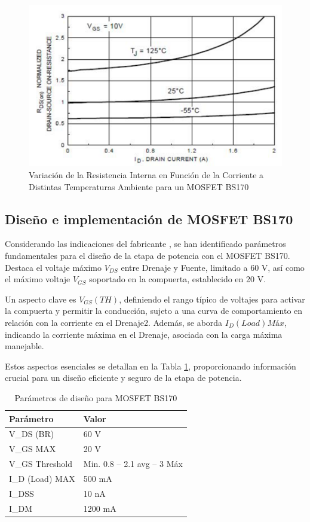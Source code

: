\begin{figure}[h]
  \centering
  \includegraphics[width=0.9\linewidth]{Pictures/resvscorriente.png} 
  \caption{Variación de la Resistencia Interna en Función de la Corriente a Distintas Temperaturas Ambiente para un MOSFET BS170 \cite{BS170Datasheet}}
  \label{fig:resinternavscorriente}
\end{figure}

\newpage

\subsection{Diseño e implementación de MOSFET BS170}
    

Considerando las indicaciones del fabricante \cite{BS170Datasheet}, se han identificado parámetros fundamentales para el diseño de la etapa de potencia con el MOSFET BS170. Destaca el voltaje máximo $V_{DS}$ entre Drenaje y Fuente, limitado a 60 V, así como el máximo voltaje $V_{GS}$ soportado en la compuerta, establecido en 20 V.

Un aspecto clave es $V_{GS}(TH)$, definiendo el rango típico de voltajes para activar la compuerta y permitir la conducción, sujeto a una curva de comportamiento en relación con la corriente en el Drenaje2. Además, se aborda $I_{D}(Load) Máx$, indicando la corriente máxima en el Drenaje, asociada con la carga máxima manejable.

Estos aspectos esenciales se detallan en la Tabla \ref{tab:Designbs170}, proporcionando información crucial para un diseño eficiente y seguro de la etapa de potencia.

\begin{table}[!ht]
    \centering
    \begin{tabular}{l l}
    \hline
        \textbf{Parámetro} & \textbf{Valor} \\ \hline
        V\_DS (BR) & 60 V \\ 
        V\_GS  MAX & 20 V \\ 
        V\_GS Threshold & Min. 0.8 – 2.1 avg – 3 Máx \\ 
        I\_D (Load) MAX & 500 mA \\ 

        I\_DSS & 10 nA \\ 
        I\_DM & 1200 mA \\ 
    \hline
    \end{tabular}
    \caption{Parámetros de diseño para MOSFET BS170}
    \label{tab:Designbs170}
\end{table}

